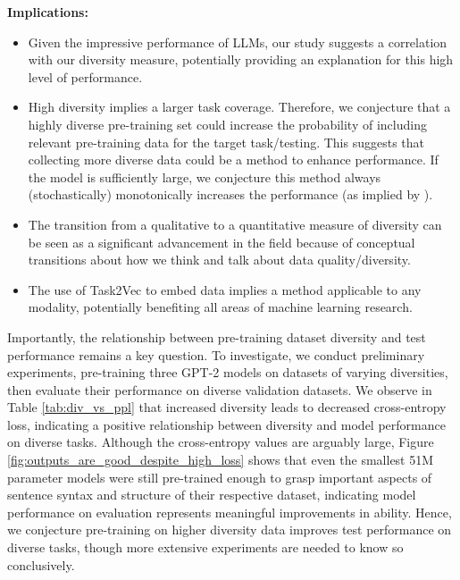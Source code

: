 \documentclass[10pt]{article} %
\begin{document}
\textbf{Implications:}
\begin{itemize}
    \item Given the impressive performance of LLMs, our study suggests a correlation with our diversity measure, potentially providing an explanation for this high level of performance.
    \item High diversity implies a larger task coverage. 
    Therefore, we conjecture that a highly diverse pre-training set could increase the probability of including relevant pre-training data for the target task/testing.
    This suggests that collecting more diverse data could be a method to enhance performance.
    If the model is sufficiently large, we conjecture this method always (stochastically) monotonically increases the performance (as implied by \citep{zhang2021understanding}).
    \item The transition from a qualitative to a quantitative measure of diversity can be seen as a significant advancement in the field because of conceptual transitions about how we think and talk about data quality/diversity.
    \item The use of Task2Vec to embed data implies a method applicable to any modality, potentially benefiting all areas of machine learning research.
\end{itemize}

Importantly, the relationship between pre-training dataset diversity and test performance remains a key question.
To investigate, we conduct preliminary experiments, pre-training three GPT-2 models on datasets of varying diversities, then evaluate their performance on diverse validation datasets.
We observe in Table \ref{tab:div_vs_ppl} that increased diversity leads to decreased cross-entropy loss, indicating a positive relationship between diversity and model performance on diverse tasks. Although the cross-entropy values are arguably large, Figure \ref{fig:outputs_are_good_despite_high_loss} shows that even the smallest 51M parameter models were still pre-trained enough to grasp important aspects of sentence syntax and structure of their respective dataset, indicating model performance on evaluation represents meaningful improvements in ability. 
Hence, we conjecture pre-training on higher diversity data improves test performance on diverse tasks, though more extensive experiments are needed to know so conclusively.
\end{document}
